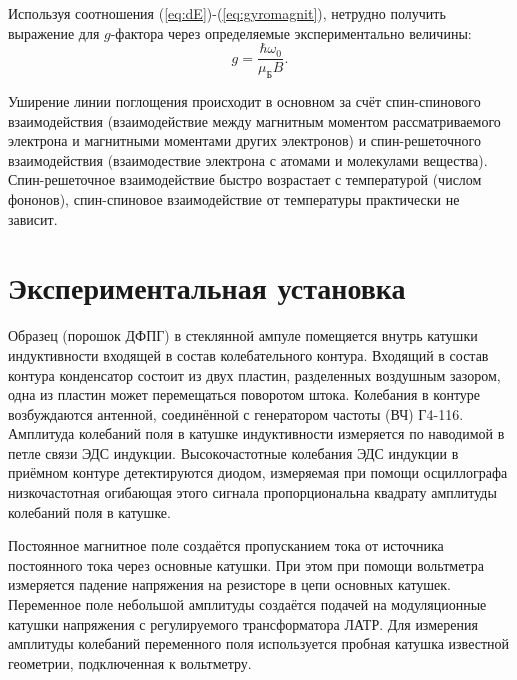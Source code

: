 \documentclass[a4paper, 12pt]{article}
\begin{document}
        Используя соотношения (\ref{eq:dE})-(\ref{eq:gyromagnit}), нетрудно получить выражение для $g$-фактора через определяемые экспериментально величины:
        \begin{equation}
            \label{eq:g-faktor}
            \tag{$\star$}
            g = \frac{\hbar \omega_0}{\mu_\text{Б}B}.
        \end{equation}

        Уширение линии поглощения происходит в основном за счёт спин-спинового взаимодействия
        (взаимодействие между магнитным моментом рассматриваемого электрона и магнитными моментами других электронов)
        и спин-решеточного взаимодействия (взаимодествие электрона с атомами и молекулами вещества).
        Спин-решеточное взаимодействие быстро возрастает с температурой (числом фононов),
        спин-спиновое взаимодействие от температуры практически не зависит.

    \section{Экспериментальная установка}

        Образец (порошок ДФПГ) в стеклянной ампуле помещяется внутрь катушки индуктивности входящей в состав колебательного контура.
        Входящий в состав контура конденсатор состоит из двух пластин, разделенных воздушным зазором, одна из пластин может перемещаться поворотом штока.
        Колебания в контуре возбуждаются антенной, соединённой с генератором частоты (ВЧ) Г4-116.
        Амплитуда колебаний поля в катушке индуктивности измеряется по наводимой в петле связи ЭДС индукции.
        Высокочастотные колебания ЭДС индукции в приёмном контуре детектируются диодом,
        измеряемая при помощи осциллографа низкочастотная огибающая этого сигнала пропорциональна квадрату амплитуды колебаний поля в катушке.


        Постоянное магнитное поле создаётся пропусканием тока от источника постоянного тока через основные катушки.
        При этом при помощи вольтметра измеряется падение напряжения на резисторе в цепи основных катушек.
        Переменное поле небольшой амплитуды создаётся подачей на модуляционные катушки напряжения с регулируемого трансформатора ЛАТР.
        Для измерения амплитуды колебаний переменного поля используется пробная катушка известной геометрии, подключенная к вольтметру.
\end{document}
